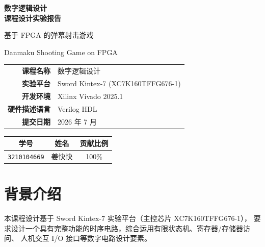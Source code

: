 \documentclass[12pt,a4paper]{ctexart}
\begin{document}
\begin{titlepage}
\centering

\vspace*{3cm}

{\Huge\bfseries 数字逻辑设计\\课程设计实验报告\\}

\vspace{1.5cm}

{\LARGE 基于 FPGA 的弹幕射击游戏\\}

\vspace{0.8cm}

{\Large Danmaku Shooting Game on FPGA\\}

\vspace{2cm}

\begin{tabular}{rl}
\toprule
\textbf{课程名称} & 数字逻辑设计 \\
\textbf{实验平台} & Sword Kintex-7 (XC7K160TFFG676-1) \\
\textbf{开发环境} & Xilinx Vivado 2025.1 \\
\textbf{硬件描述语言} & Verilog HDL \\
\textbf{提交日期} & 2026 年 7 月 \\
\bottomrule
\end{tabular}

\vspace{2cm}

\begin{tabular}{ccc}
\toprule
\textbf{学号} & \textbf{姓名} & \textbf{贡献比例} \\
\midrule
\multicolumn{1}{c}{\texttt{3210104669}} & {姜快快} & 100\% \\
\bottomrule
\end{tabular}

\vfill

\end{titlepage}

\newpage
\tableofcontents
\newpage

\section{背景介绍}

本课程设计基于 Sword Kintex-7 实验平台（主控芯片 XC7K160TFFG676-1），
要求设计一个具有完整功能的时序电路，综合运用有限状态机、寄存器/存储器访问、
人机交互 I/O 接口等数字电路设计要素。
\end{document}
